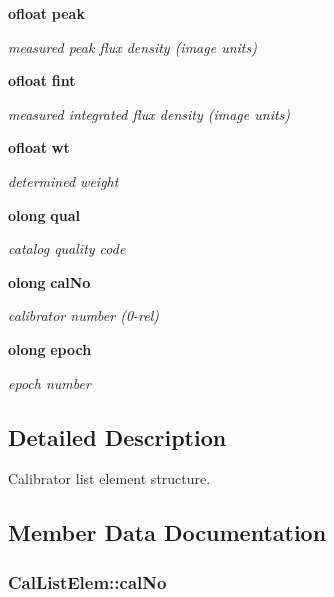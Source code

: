\begin{CompactItemize}
{\bf ofloat} {\bf peak}
\begin{CompactList}\small\item\em measured peak flux density (image units) \item\end{CompactList}\item 
{\bf ofloat} {\bf fint}
\begin{CompactList}\small\item\em measured integrated flux density (image units) \item\end{CompactList}\item 
{\bf ofloat} {\bf wt}
\begin{CompactList}\small\item\em determined weight \item\end{CompactList}\item 
{\bf olong} {\bf qual}
\begin{CompactList}\small\item\em catalog quality code \item\end{CompactList}\item 
{\bf olong} {\bf cal\-No}
\begin{CompactList}\small\item\em calibrator number (0-rel) \item\end{CompactList}\item 
{\bf olong} {\bf epoch}
\begin{CompactList}\small\item\em epoch number \item\end{CompactList}\end{CompactItemize}


\subsection{Detailed Description}
Calibrator list element structure. 



\subsection{Member Data Documentation}
\subsubsection{ {\bf Cal\-List\-Elem::cal\-No}}\label{structCalListElem_o11}


